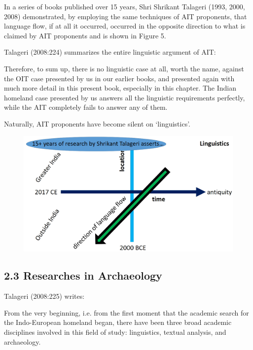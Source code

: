 In a series of books published over 15 years, Shri Shrikant Talageri (1993, 2000, 2008) demonstrated, by employing the same techniques of AIT proponents, that language flow, if at all it occurred, occurred in the opposite direction to what is claimed by AIT proponents and is shown in Figure 5.

Talageri (2008:224) summarizes the entire linguistic argument of AIT:

\begin{myquote}
Therefore, to sum up, there is no linguistic case at all, worth the name, against the OIT case presented by us in our earlier books, and presented again with much more detail in this present book, especially in this chapter. The Indian homeland case presented by us answers all the linguistic requirements perfectly, while the AIT completely fails to answer any of them.
\end{myquote}

Naturally, AIT proponents have become silent on ‘linguistics’.

\begin{figure}[!htbp]
\includegraphics[scale=0.15]{images/8-05.jpg}
\caption{}\label{art8-fig05}
\end{figure}


\subsection*{2.3 Researches in Archaeology}

Talageri (2008:225) writes:

\begin{myquote}
From the very beginning, i.e. from the first moment that the academic search for the Indo-European homeland began, there have been three broad academic disciplines involved in this field of study: linguistics, textual analysis, and archaeology.
\end{myquote}

